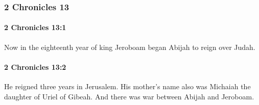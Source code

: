 	\subsubsection{2 Chronicles 13} %
		\label{2CHRONICLES-13}

		\paragraph{2 Chronicles 13:1} %
			\label{2CHRONICLES-13-1}

			Now in the eighteenth year of king Jeroboam began Abijah to reign over Judah.


		\paragraph{2 Chronicles 13:2} %
			\label{2CHRONICLES-13-2}

			He reigned three years in Jerusalem. His mother's name also was Michaiah the daughter of Uriel of Gibeah. And there was war between Abijah and Jeroboam.

